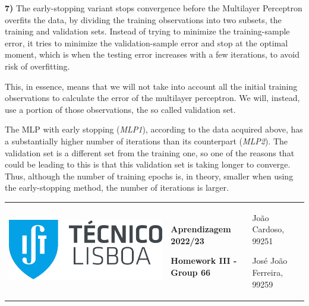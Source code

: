 \documentclass[11pt,a4paper]{article}
\begin{document}
\begin{flushleft}
\vspace{-2mm}
\textbf{7)}
The early-stopping variant stops convergence before the Multilayer Perceptron overfits the data, by dividing the training observations into two subsets, the training and validation sets. Instead of trying to minimize the training-sample error, it tries to minimize the validation-sample error and stop at the optimal moment, which is when the testing error increases with a few iterations, to avoid risk of overfitting.

This, in essence, means that we will not take into account all the initial training observations to calculate the error of the multilayer perceptron. We will, instead, use a portion of those observations, the so called validation set.

The MLP with early stopping (\textit{MLP1}), according to the data acquired above, has a substantially higher number of iterations than its counterpart (\textit{MLP2}).
The validation set is a different set from the training one, so one of the reasons that could be leading to this is that this validation set is taking longer to converge.
Thus, although the number of training epochs is, in theory, smaller when using the early-stopping method, the number of iterations is larger.
\end{flushleft}

\pagebreak
\hspace{-8.25mm}
\color{darkgray}
\renewcommand\tabularxcolumn[1]{m{#1}}
\begin{tabularx}{1.09\textwidth} {>{\raggedright\arraybackslash}X >{\centering\arraybackslash}X >{\raggedleft\arraybackslash}X}
  \includegraphics[scale=0.2]{tecnico.pdf} &
  \textbf{Aprendizagem 2022/23} \par \textbf{Homework III - Group 66} &
  João Cardoso, 99251 \par José João Ferreira, 99259
\end{tabularx}
\renewcommand\tabularxcolumn[1]{p{#1}}
\color{black}
\end{document}
